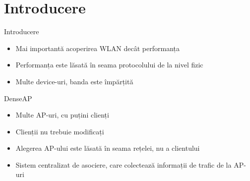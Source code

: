 \section{Introducere}

\begin{frame}{Introducere}
  \begin{itemize}
    \item Mai importantă acoperirea WLAN decât performanța
    \item Performanța este lăsată în seama protocolului de la nivel fizic
    \item Multe device-uri, banda este împărțită
  \end{itemize}
\end{frame}

\begin{frame}{DenseAP}
  \begin{itemize}
    \item Multe AP-uri, cu puțini clienți
    \item Clienții nu trebuie modificați
    \pause
    \item Alegerea AP-ului este lăsată în seama rețelei, nu a clientului
    \item Sistem centralizat de asociere, care colectează informații de trafic de la AP-uri
  \end{itemize}
\end{frame}

